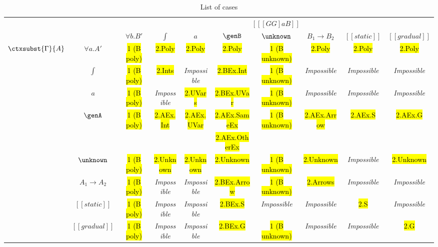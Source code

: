 \begin{landscape}
\begin{table}
  \centering
  \begin{footnotesize}
\begin{tabular}{cccccccccc} \toprule
&                 & \multicolumn{8}{c}{ $[[ [GG]aB  ]]$  }  \\
&                 & $\forall b. B'$  & $\int$      & $a$         & $\genB$     & $\unknown$          & $B_1 \to B_2$ & $[[static]]$ & $[[gradual]]$ \\ \cmidrule{3-10}
   \multirow{6}{*}{$\ctxsubst{\Gamma}{A}$} & $\forall a. A'$ & \hl{1 (B poly)}  & \hl{2.Poly} & \hl{2.Poly} & \hl{2.Poly} & \hl{1 (B unknown)}         &  \hl{2.Poly} & \hl{2.Poly}  & \hl{2.Poly}  \\ \cmidrule{3-10}
& $\int$          & \hl{1 (B poly)}  &  \hl{2.Ints}           &  \textit{Impossible} & \hl{2.BEx.Int}            & \hl{1 (B unknown)}  &  \textit{Impossible} &  \textit{Impossible} &  \textit{Impossible} \\ \cmidrule{3-10}
& $a$             &  \hl{1 (B poly)} & \textit{Impossible} &  \hl{2.UVars}           &  \hl{2.BEx.UVar}           &  \hl{1 (B unknown)} &  \textit{Impossible}  &  \textit{Impossible} &  \textit{Impossible} \\ \cmidrule{3-10}
& \multirow{2}{*}{$\genA$}         & \multirow{2}{*}{\hl{1 (B poly)}}   & \multirow{2}{*}{\hl{2.AEx.Int}} & \multirow{2}{*}{\hl{2.AEx.UVar}} & \hl{2.AEx.SameEx}  & \multirow{2}{*}{\hl{1 (B unknown)}}  & \multirow{2}{*}{\hl{2.AEx.Arrow}} & \multirow{2}{*}{\hl{2.AEx.S}} & \multirow{2}{*}{\hl{2.AEx.G}}  \\
& & & & & \hl{2.AEx.OtherEx} &   &   \\ \cmidrule{3-10}
& $\unknown$      & \hl{1 (B poly)}  & \hl{2.Unknown} &  \hl{2.Unknown}  &  \hl{2.Unknown} & \hl{1 (B unknown)}  & \hl{2.Unknown} & \textit{Impossible} & \hl{2.Unknown}  \\ \cmidrule{3-10}
  & $A_1 \to A_2$     & \hl{1 (B poly)}  & \textit{Impossible} &  \textit{Impossible}  & \hl{2.BEx.Arrow}  & \hl{1 (B unknown)}  & \hl{2.Arrows} &  \textit{Impossible} &  \textit{Impossible} \\ \cmidrule{3-10}
  & $[[static]]$     & \hl{1 (B poly)}  & \textit{Impossible} &  \textit{Impossible}  & \hl{2.BEx.S} & \textit{Impossible} & \textit{Impossible} & \hl{2.S} &  \textit{Impossible}  \\ \cmidrule{3-10}
  & $[[gradual]]$     & \hl{1 (B poly)}  & \textit{Impossible} &  \textit{Impossible}  & \hl{2.BEx.G} & \hl{1 (B unknown)} & \textit{Impossible} & \textit{Impossible} & \hl{2.G} \\ \bottomrule
\end{tabular}
  \end{footnotesize}
\caption{List of cases} \label{table:complete}
\end{table}
\end{landscape}

